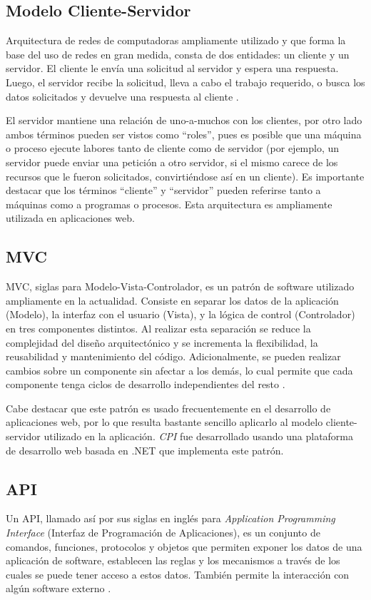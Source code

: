 \subsection{Modelo Cliente-Servidor}
Arquitectura de redes de computadoras ampliamente utilizado y que forma la base del uso de redes en gran medida, consta de dos entidades: un cliente y un servidor. El cliente le envía una solicitud al servidor y espera una respuesta. Luego, el servidor recibe la solicitud, lleva a cabo el trabajo requerido, o busca los datos solicitados y devuelve una respuesta al cliente \cite{redesTanenbaum}.

El servidor mantiene una relación de uno-a-muchos con los clientes, por otro lado ambos términos pueden ser vistos como “roles”, pues es posible que una máquina o proceso ejecute labores tanto de cliente como de servidor (por ejemplo, un servidor puede enviar una petición a otro servidor, si el mismo carece de los recursos que le fueron solicitados, convirtiéndose así en un cliente). Es importante destacar que los términos “cliente” y “servidor” pueden referirse tanto a máquinas como a programas o procesos. Esta arquitectura es ampliamente utilizada en aplicaciones web.

\subsection{MVC}
MVC, siglas para Modelo-Vista-Controlador, es un patrón de software utilizado ampliamente en la actualidad. Consiste en separar los datos de la aplicación (Modelo), la interfaz con el usuario (Vista), y la lógica de control (Controlador) en tres componentes distintos. Al realizar esta separación se reduce la complejidad del diseño arquitectónico y se incrementa la flexibilidad, la reusabilidad y mantenimiento del código. Adicionalmente, se pueden realizar cambios sobre un componente sin afectar a los demás, lo cual permite que cada componente tenga ciclos de desarrollo independientes del resto \cite{mvcKrasner}. 

Cabe destacar que este patrón es usado frecuentemente en el desarrollo de aplicaciones web, por lo que resulta bastante sencillo aplicarlo al modelo cliente-servidor utilizado en la aplicación. \textit{CPI} fue desarrollado usando una plataforma de desarrollo web basada en .NET \cite{netMicrosoft} que implementa este patrón.

\subsection{API}
Un API, llamado así por sus siglas en inglés para \textit{Application Programming Interface} (Interfaz de Programación de Aplicaciones), es un conjunto de comandos, funciones, protocolos y objetos que permiten exponer los datos de una aplicación de software, establecen las reglas y los mecanismos a través de los cuales se puede tener acceso a estos datos. También permite la interacción con algún software externo \cite{apiChristensson}.

